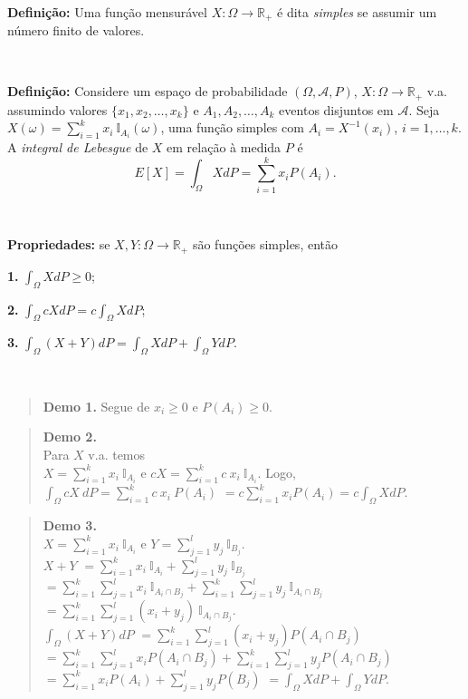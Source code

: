 \documentclass[
]{book}
\begin{document}
\(~\)

\textbf{Definição:} Uma função mensurável \(X: \Omega \longrightarrow \mathbb{R}_+\) é dita \emph{simples} se assumir um número finito de valores.

\(~\)

\textbf{Definição:} Considere um espaço de probabilidade \((\Omega, \mathcal{A}, P)\), \(X:\Omega\longrightarrow \mathbb{R}_+\) v.a. assumindo valores \(\{x_1,x_2,\ldots,x_k\}\) e \(A_1,A_2,\ldots,A_k\) eventos disjuntos em \(\mathcal{A}\). Seja \(\displaystyle X(\omega) = \sum_{i=1}^{k} x_i ~\mathbb{I}_{A_i}(\omega)\), uma função simples com \(A_i = X^{-1}(x_i)\), \(i=1,\ldots,k\). A \emph{integral de Lebesgue} de \(X\) em relação à medida \(P\) é
\[E[X] = \int_\Omega X dP = \sum_{i=1}^{k} x_i P(A_i).\]

\(~\)

\textbf{Propriedades:} se \(X, Y: \Omega \longrightarrow \mathbb{R}_+\) são funções simples, então

\textbf{1.} \(\displaystyle\int_\Omega X dP \geq 0\);

\textbf{2.} \(\displaystyle\int_\Omega cX dP = c\int_\Omega X dP\);

\textbf{3.} \(\displaystyle\int_\Omega (X+Y) dP = \int_\Omega X dP + \int_\Omega Y dP\).

\(~\)

\begin{quote}
\textbf{Demo 1.} Segue de \(x_i \geq 0\) e \(P(A_i) \geq 0\).
\end{quote}

\begin{quote}
\textbf{Demo 2.}\\
Para \(X\) v.a. temos\\
\(X =\displaystyle \sum_{i=1}^kx_i~\mathbb{I}_{A_i}\) e \(cX = \displaystyle\sum_{i=1}^k c~x_i ~\mathbb{I}_{A_i}\). Logo,\\
\(\displaystyle\int_\Omega cX~dP = \sum_{i=1}^k c~x_i~P(A_i)\) \(=\displaystyle c\sum_{i=1}^kx_i P(A_i) = c\int_\Omega X dP\).
\end{quote}

\begin{quote}
\textbf{Demo 3.}\\
\(X = \sum_{i=1}^kx_i~\mathbb{I}_{A_i}\) e \(Y = \sum_{j=1}^ly_j~\mathbb{I}_{B_j}\).\\
\(X + Y\) \(=\displaystyle \sum_{i=1}^k x_i ~\mathbb{I}_{A_i} + \sum_{j=1}^l y_j~\mathbb{I}_{B_j}\) \(=\displaystyle\sum_{i=1}^k\sum_{j=1}^lx_i~\mathbb{I}_{A_i\cap B_j} + \sum_{i=1}^k\sum_{j=1}^ly_j~\mathbb{I}_{A_i\cap B_j}\) \(=\displaystyle\sum_{i=1}^k\sum_{j=1}^l(x_i+y_j)~\mathbb{I}_{A_i\cap B_j}\).\\
\(\displaystyle \int_\Omega (X + Y) dP\) \(=\displaystyle \sum_{i=1}^k\sum_{j=1}^l (x_i + y_j)P(A_i\cap B_j)\) \(=\displaystyle\sum_{i=1}^k\sum_{j=1}^l x_iP(A_i\cap B_j) + \sum_{i=1}^k\sum_{j=1}^l y_jP(A_i\cap B_j)\) \(=\displaystyle\sum_{i=1}^k x_i P(A_i) + \sum_{j=1}^l y_j P(B_j)\) \(=\displaystyle\int_\Omega X dP + \int_\Omega Y dP\).
\end{quote}
\end{document}
